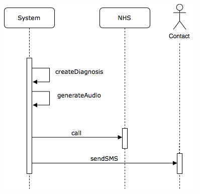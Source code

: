 \begin{figure}[H]
    \centering
    \includegraphics[scale=0.8]{rasdL/Pictures/emergency-sequence.png}
    
\end{figure}
